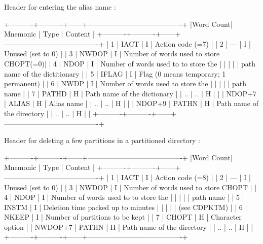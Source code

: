 \begin{XMP}
   Header for entering the alias name :

 +----------+----------+------+----------------------------------------+
 |Word Count| Mnemonic | Type |         Content                        |
 +----------+----------+------+----------------------------------------+
 |        1 |   IACT   |   I  | Action code (=7)                       |
 |        2 |    ---   |   I  | Unused (set to 0)                      |
 |        3 |  NWDOP   |   I  | Number of words used to store CHOPT(=0)|
 |        4 |   NDOP   |   I  | Number of words used to to store the   |
 |          |          |      | path name of the dictitionary          |
 |        5 |  IFLAG   |   I  | Flag (0 means temporary; 1 permanent)  |
 |        6 |   NWDP   |   I  | Number of words used to store the      |
 |          |          |      | path name                              |
 |        7 |  PATHD   |   H  | Path name of the dictionary            |
 |       .. |     ..   |   H  |                                        |
 |   NDOP+7 |  ALIAS   |   H  | Alias name                             |
 |       .. |     ..   |   H  |                                        |
 |   NDOP+9 |  PATHN   |   H  | Path name of the directory             |
 |       .. |     ..   |   H  |                                        |
 +----------+----------+------+----------------------------------------+

   Header for deleting a few partitions in a partitioned directory :

 +----------+----------+------+----------------------------------------+
 |Word Count| Mnemonic | Type |         Content                        |
 +----------+----------+------+----------------------------------------+
 |        1 |   IACT   |   I  | Action code (=8)                       |
 |        2 |    ---   |   I  | Unused (set to 0)                      |
 |        3 |  NWDOP   |   I  | Number of words used to store CHOPT    |
 |        4 |   NDOP   |   I  | Number of words used to to store the   |
 |          |          |      | path name                              |
 |        5 |  INSTM   |   I  | Deletion time packed up to minutes     |
 |          |          |      | (see CDPKTM)                           |
 |        6 |  NKEEP   |   I  | Number of partitions to be kept        |
 |        7 |  CHOPT   |   H  | Character option                       |
 |  NWDOP+7 |  PATHN   |   H  | Path name of the directory             |
 |       .. |     ..   |   H  |                                        |
 +----------+----------+------+----------------------------------------+

\end{XMP}

